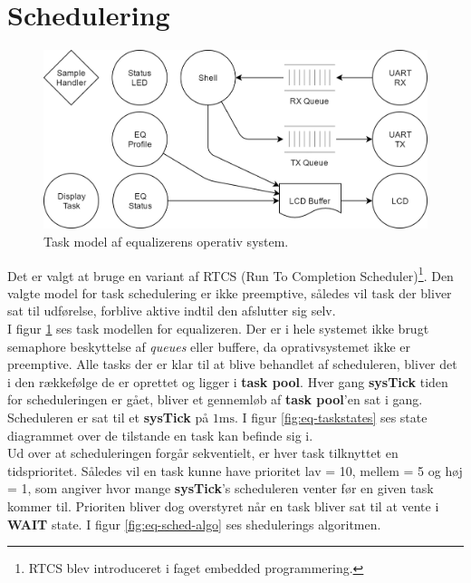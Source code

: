 \section{Schedulering}

\begin{figure}[h!]
	\centering
	\includegraphics[width=.7\textwidth]{billeder/eq-one.png}
	\caption{Task model af equalizerens operativ system.}
	\label{fig:eq-taskmodel}
\end{figure}

Det er valgt at bruge en variant af RTCS (Run To Completion Scheduler)\footnote{RTCS blev introduceret i faget embedded programmering.}. 
Den valgte model for task schedulering er ikke preemptive, således vil task der bliver sat til udførelse, forblive aktive indtil den afslutter sig selv. \\

I figur \ref{fig:eq-taskmodel} ses task modellen for equalizeren. 
Der er i hele systemet ikke brugt semaphore beskyttelse af \textit{queues} eller buffere, da oprativsystemet ikke er preemptive.
Alle tasks der er klar til at blive behandlet af scheduleren, bliver det i den rækkefølge de er oprettet og ligger i \textbf{task pool}. Hver gang \textbf{sysTick} tiden for scheduleringen er gået, bliver et gennemløb af \textbf{task pool}'en sat i gang. Scheduleren er sat til et \textbf{sysTick} på $1\si{\milli\second}$.
I figur \ref{fig:eq-taskstates} ses state diagrammet over de tilstande en task kan befinde sig i.\\

Ud over at scheduleringen forgår sekventielt, er hver task tilknyttet en tidsprioritet. 
Således vil en task kunne have prioritet lav = 10, mellem = 5 og høj = 1, som angiver hvor mange \textbf{sysTick}'s scheduleren venter før en given task kommer til.
Prioriten bliver dog overstyret når en task bliver sat til at vente i \textbf{WAIT} state. 
I figur \ref{fig:eq-sched-algo} ses shedulerings algoritmen.

